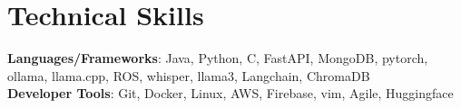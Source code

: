 \documentclass[letterpaper,10pt]{article}
\begin{document}


\section{Technical Skills}
 \begin{itemize}[leftmargin=0.15in, label={}]
    \small{\item{
     \textbf{Languages/Frameworks}{: Java, Python, C, FastAPI, MongoDB, pytorch, ollama, llama.cpp, ROS, whisper, llama3, Langchain, ChromaDB} \\
     \textbf{Developer Tools}{: Git, Docker, Linux, AWS, Firebase, vim, Agile, Huggingface} \\
    }}

 \end{itemize}
\end{document}
